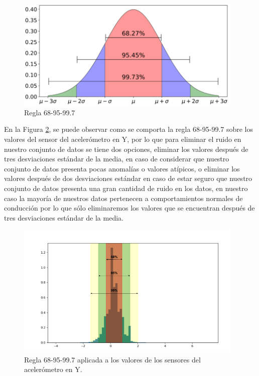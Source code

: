 \begin{figure}[h!]
  \begin{center}	\includegraphics[width=0.97\textwidth]{imagenes/Cap3/68-95-99_rule}
  \caption{Regla 68-95-99.7 }
  \label{fig:689599rule}
  \end{center}
\end{figure}

En la Figura \ref{fig:689599rule_acc_y}, se puede observar como se comporta la regla 68-95-99.7 sobre los valores del sensor del aceler\'{o}metro en Y, por lo que para eliminar el ruido en nuestro conjunto de datos se tiene dos opciones, eliminar los valores despu\'{e}s de tres desviaciones est\'{a}ndar de la media, en caso de considerar que nuestro conjunto de datos presenta pocas anomal\'{i}as o valores at\'{i}picos, o eliminar los valores despu\'{e}s de dos desviaciones est\'{a}ndar en caso de estar seguro que nuestro conjunto de datos presenta una gran cantidad de ruido en los datos, en nuestro caso la mayor\'{i}a de nuestros datos pertenecen a comportamientos normales de conducci\'{o}n por lo que s\'{o}lo eliminaremos los valores que se encuentran despu\'{e}s de tres desviaciones est\'{a}ndar de la media.


\begin{figure}[h!]
  \begin{center}	\includegraphics[width=0.97\textwidth]{imagenes/Cap3/acc_y_689599_rule}
  \caption{Regla 68-95-99.7 aplicada a los valores de los sensores del aceler\'{o}metro en Y. }
  \label{fig:689599rule_acc_y}
  \end{center}
\end{figure}

